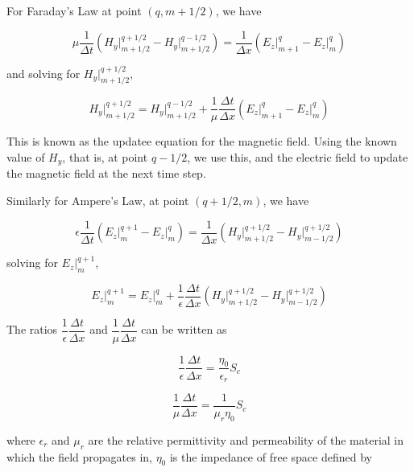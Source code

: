 \documentclass{article}
\begin{document}
For Faraday's Law at point \((q, m+1/2)\), we have

\begin{equation}
\mu \dfrac{1}{\Delta t} \left (H_y \Big |^{q+1/2}_{m+1/2} - H_y \Big |^{q-1/2}_{m+1/2} \right ) = \dfrac{1}{\Delta x} \left ( E_z \Big |^{q}_{m+1} - E_z \Big |^{q}_{m} \right )
\end{equation}

and solving for \(H_y \Big |^{q+1/2}_{m+1/2}\),

\begin{equation}
H_y \Big |^{q+1/2}_{m+1/2} = H_y \Big |^{q-1/2}_{m+1/2} + \dfrac{1}{\mu} \dfrac{\Delta t}{\Delta x} \left ( E_z \Big |^{q}_{m+1} - E_z \Big |^{q}_{m} \right )
\end{equation}

This is known as the updatee equation for the magnetic field. Using the
known value of \(H_y\), that is, at point \(q-1/2\), we use this, and
the electric field to update the magnetic field at the next time step.

Similarly for Ampere's Law, at point \((q+1/2, m)\), we have

\begin{equation}
\epsilon \dfrac{1}{\Delta t} \left ( E_z \Big |^{q+1}_{m} - E_z \Big |^{q}_{m} \right ) = \dfrac{1}{\Delta x} \left ( H_y \Big |^{q+1/2}_{m+1/2} - H_y \Big |^{q+1/2}_{m-1/2} \right )
\end{equation}

solving for \(E_z \Big |^{q+1}_{m}\),

\begin{equation}
E_z \Big |^{q+1}_{m} = E_z \Big |^{q}_{m} + \dfrac{1}{\epsilon} \dfrac{\Delta t}{\Delta x} \left ( H_y \Big |^{q+1/2}_{m+1/2} - H_y \Big |^{q+1/2}_{m-1/2} \right )
\end{equation}

The ratios \(\dfrac{1}{\epsilon} \dfrac{\Delta t}{\Delta x}\) and
\(\dfrac{1}{\mu} \dfrac{\Delta t}{\Delta x}\) can be written as

\begin{equation}
\dfrac{1}{\epsilon} \dfrac{\Delta t}{\Delta x} = \dfrac{\eta_0}{\epsilon_r} S_c
\end{equation}

\begin{equation}
\dfrac{1}{\mu} \dfrac{\Delta t}{\Delta x} = \dfrac{1}{\mu_r \eta_0} S_c
\end{equation}

where \(\epsilon_r\) and \(\mu_r\) are the relative permittivity and
permeability of the material in which the field propagates in,
\(\eta_0\) is the impedance of free space defined by
\end{document}
